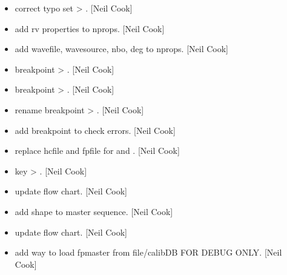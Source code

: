\documentclass[a4paper,10pt,english]{report}
\begin{document}
\begin{itemize}
\item {} 
 \sphinxhyphen{} correct typo set \textendash{}\textgreater{}
. {[}Neil Cook{]}

\item {} 
 \sphinxhyphen{} add rv properties to nprops.
{[}Neil Cook{]}

\item {} 
 \sphinxhyphen{} add wavefile, wavesource, nbo, deg to nprops.
{[}Neil Cook{]}

\item {} 
 \sphinxhyphen{} breakpoint \textendash{}\textgreater{} . {[}Neil Cook{]}

\item {} 
 \sphinxhyphen{} breakpoint \textendash{}\textgreater{} . {[}Neil Cook{]}

\item {} 
 \sphinxhyphen{} rename breakpoint \textendash{}\textgreater{} .
{[}Neil Cook{]}

\item {} 
 \sphinxhyphen{} add breakpoint to check
errors. {[}Neil Cook{]}

\item {} 
 \sphinxhyphen{} replace hcfile and fpfile
for  and . {[}Neil Cook{]}

\item {} 
 \sphinxhyphen{} key 
\textendash{}\textgreater{} . {[}Neil Cook{]}

\item {} 
 \textendash{} update flow chart. {[}Neil Cook{]}

\item {} 
 \sphinxhyphen{} add shape to master
sequence. {[}Neil Cook{]}

\item {} 
 \textendash{} update flow chart. {[}Neil Cook{]}

\item {} 
 \sphinxhyphen{} add way to load fpmaster
from file/calibDB \textendash{} FOR DEBUG ONLY. {[}Neil Cook{]}

\end{itemize}
\end{document}
